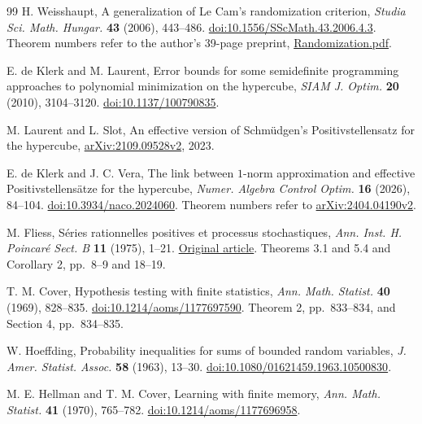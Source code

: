 \begin{thebibliography}{99}
H. Weisshaupt, A generalization of Le Cam's randomization criterion,
\emph{Studia Sci. Math. Hungar.} \textbf{43} (2006), 443--486.
\href{https://doi.org/10.1556/SScMath.43.2006.4.3}{doi:10.1556/SScMath.43.2006.4.3}.
Theorem numbers refer to the author's 39-page preprint,
\href{https://www.weiszhaupt.at/publications/Randomization.pdf}{Randomization.pdf}.


E. de Klerk and M. Laurent, Error bounds for some semidefinite
programming approaches to polynomial minimization on the hypercube,
\emph{SIAM J. Optim.} \textbf{20} (2010), 3104--3120.
\href{https://doi.org/10.1137/100790835}{doi:10.1137/100790835}.


M. Laurent and L. Slot, An effective version of Schm\"udgen's
Positivstellensatz for the hypercube,
\href{https://arxiv.org/abs/2109.09528v2}{arXiv:2109.09528v2}, 2023.


E. de Klerk and J. C. Vera, The link between $1$-norm approximation
and effective Positivstellens\"atze for the hypercube,
\emph{Numer. Algebra Control Optim.} \textbf{16} (2026), 84--104.
\href{https://doi.org/10.3934/naco.2024060}{doi:10.3934/naco.2024060}.
Theorem numbers refer to
\href{https://arxiv.org/abs/2404.04190v2}{arXiv:2404.04190v2}.

M. Fliess, S\'eries rationnelles positives et processus stochastiques,
\emph{Ann. Inst. H. Poincar\'e Sect. B} \textbf{11} (1975), 1--21.
\href{https://www.numdam.org/item/AIHPB_1975__11_1_1_0/}{Original article}.
Theorems 3.1 and 5.4 and Corollary 2, pp.~8--9 and 18--19.

T. M. Cover, Hypothesis testing with finite statistics,
\emph{Ann. Math. Statist.} \textbf{40} (1969), 828--835.
\href{https://doi.org/10.1214/aoms/1177697590}{doi:10.1214/aoms/1177697590}.
Theorem 2, pp.~833--834, and Section 4, pp.~834--835.

W. Hoeffding, Probability inequalities for sums of bounded random
variables, \emph{J. Amer. Statist. Assoc.} \textbf{58} (1963), 13--30.
\href{https://doi.org/10.1080/01621459.1963.10500830}{doi:10.1080/01621459.1963.10500830}.

M. E. Hellman and T. M. Cover, Learning with finite memory,
\emph{Ann. Math. Statist.} \textbf{41} (1970), 765--782.
\href{https://doi.org/10.1214/aoms/1177696958}{doi:10.1214/aoms/1177696958}.

\end{thebibliography}
